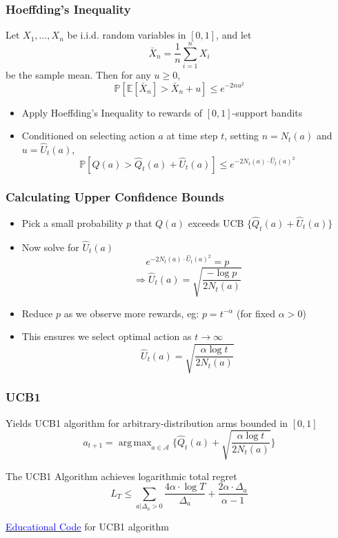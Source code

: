 \documentclass[handout]{beamer}
\DeclareMathOperator*{\argmax}{arg\,max}
\begin{document}
\begin{frame}
\frametitle{Hoeffding's Inequality}
\pause
\begin{theorem}
Let $X_1, \ldots, X_n$ be i.i.d. random variables in $[0,1]$, and let $$\bar{X}_n = \frac 1 n \sum_{i=1}^n X_i$$ be the sample mean. Then for any $u \geq 0$,
$$\mathbb{P}[\mathbb{E}[\bar{X}_n] > \bar{X}_n + u] \leq e^{-2nu^2}$$
\end{theorem}
\begin{itemize}[<+->]
\item Apply Hoeffding's Inequality to rewards of $[0,1]$-support bandits
\item Conditioned on selecting action $a$ at time step $t$, setting $n = N_t(a)$ and $u=\hat{U}_t(a)$,
$$\mathbb{P}[Q(a) > \hat{Q}_t(a) + \hat{U}_t(a)] \leq e^{-2N_t(a) \cdot \hat{U}_t(a)^2}$$
\end{itemize}
\end{frame}



\begin{frame}
\frametitle{Calculating Upper Confidence Bounds}
\pause
\begin{itemize}[<+->]
\item Pick a small probability $p$ that $Q(a)$ exceeds UCB $\{\hat{Q}_t(a) + \hat{U}_t(a)\}$
\item Now solve for $\hat{U}_t(a)$
$$e^{-2N_t(a) \cdot \hat{U}_t(a)^2} = p$$
$$\Rightarrow \hat{U}_t(a) = \sqrt{\frac {-\log p} {2 N_t(a)}}$$
\item Reduce $p$ as we observe more rewards, eg: $p = t^{-\alpha}$ (for fixed $\alpha > 0$)
\item This ensures we select optimal action as $t\rightarrow \infty$
$$\hat{U}_t(a) = \sqrt{\frac {\alpha \log t} {2N_t(a)}}$$
\end{itemize}
\end{frame}

\begin{frame}
\frametitle{UCB1}
\pause
Yields UCB1 algorithm for arbitrary-distribution arms bounded in $[0,1]$
$$a_{t+1} = \argmax_{a\in \mathcal{A}} \{ \hat{Q}_t(a) + \sqrt{\frac {\alpha \log t} {2N_t(a)}} \}$$
\begin{theorem}
The UCB1 Algorithm achieves logarithmic total regret
$$L_T \leq \sum_{a|\Delta_a > 0} \frac {4\alpha \cdot \log T} {\Delta_a} + \frac {2\alpha \cdot \Delta_a}{\alpha - 1}$$
\end{theorem}
\href{https://github.com/TikhonJelvis/RL-book/tree/master/rl/chapter14/ucb1.py}{\underline{\textcolor{blue}{Educational Code}}} for UCB1 algorithm
\end{frame}
\end{document}
